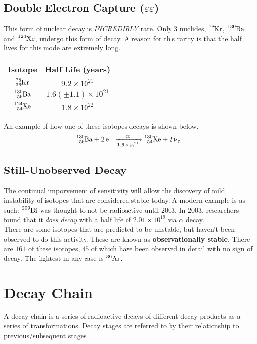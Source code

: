\documentclass{article}
\begin{document}
\begin{multicols*}{2}
    \subsection{Double Electron Capture ($\varepsilon\varepsilon$)}
    This form of nuclear decay is \textit{INCREDIBLY} rare. Only 3 nuclides,
    $\ce{^{78}Kr}$, $\ce{^{130}Ba}$ and $\ce{^{124}Xe}$, undergo this form of decay.
    A reason for this rarity is that the half lives for this mode are extremely
    long.\\

    \begin{tabular}{|c|c|}
      \hline
      \textbf{Isotope} & \textbf{Half Life (years)} \\
      \hline
      $\ce{^{78}_{36}Kr}$ & $9.2 \times 10^{21}$ \\
      $\ce{^{130}_{56}Ba}$ & $1.6(\pm{1.1})\times 10^{21}$ \\
      $\ce{^{124}_{54}Xe}$ & $1.8 \times 10^{22}$ \\
      \hline
    \end{tabular}

    An example of how one of these isotopes decays is shown below.
    \[
      \ce{^{130}_{56}Ba + 2 e- ->[\varepsilon\varepsilon][1.6 \times 10^{21}] ^{130}_{54}Xe + 2 \nu_{e}}
    \]

    \subsection{Still-Unobserved Decay}
    The continual imporvement of sensitivity will allow the discovery of mild
    instability of isotopes that are considered stable today. A modern example is as
    such: $\ce{^{209}Bi}$ was thought to not be radioactive until $2003$. In $2003$,
    researchers found that it \textit{does decay} with a half life of $2.01 \times 10^{19}$
    via $\alpha$ decay.\\

    There are some isotopes that are predicted to be unstable, but haven't been observed
    to do this activity. These are known as \textbf{observationally stable}. There are
    $161$ of these isotopes, $45$ of which have been observed in detail with no sign of
    decay. The lightest in any case is $\ce{^{36}Ar}$.

    \section{Decay Chain}
    A decay chain is a series of radioactive decays of different decay products
    as a series of transformations. Decay stages are referred to by their relationship
    to previous/subsequent stages.\\


\end{multicols*}
\end{document}
